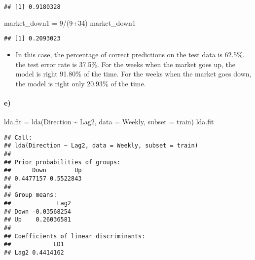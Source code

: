 \documentclass[
]{article}
\newenvironment{Shaded}{\begin{snugshade}}{\end{snugshade}}
\newcommand{\AttributeTok}[1]{\textcolor[rgb]{0.77,0.63,0.00}{#1}}
\newcommand{\DecValTok}[1]{\textcolor[rgb]{0.00,0.00,0.81}{#1}}
\newcommand{\FloatTok}[1]{\textcolor[rgb]{0.00,0.00,0.81}{#1}}
\newcommand{\FunctionTok}[1]{\textcolor[rgb]{0.00,0.00,0.00}{#1}}
\newcommand{\NormalTok}[1]{#1}
\newcommand{\OtherTok}[1]{\textcolor[rgb]{0.56,0.35,0.01}{#1}}
\newcommand{\SpecialCharTok}[1]{\textcolor[rgb]{0.00,0.00,0.00}{#1}}
\providecommand{\tightlist}{%
  \setlength{\itemsep}{0pt}\setlength{\parskip}{0pt}}
\begin{document}
\begin{verbatim}
## [1] 0.9180328
\end{verbatim}

\begin{Shaded}
\begin{Highlighting}[]
\NormalTok{market\_down1 }\OtherTok{=} \DecValTok{9}\SpecialCharTok{/}\NormalTok{(}\DecValTok{9}\SpecialCharTok{+}\DecValTok{34}\NormalTok{)}
\NormalTok{market\_down1}
\end{Highlighting}
\end{Shaded}

\begin{verbatim}
## [1] 0.2093023
\end{verbatim}

\begin{itemize}
\tightlist
\item
  In this case, the percentage of correct predictions on the test data
  is 62.5\%. the test error rate is 37.5\%. For the weeks when the
  market goes up, the model is right 91.80\% of the time. For the weeks
  when the market goes down, the model is right only 20.93\% of the
  time.
\end{itemize}

\hypertarget{e}{%
\paragraph{e)}\label{e}}

\begin{Shaded}
\begin{Highlighting}[]
\NormalTok{lda.fit }\OtherTok{=} \FunctionTok{lda}\NormalTok{(Direction }\SpecialCharTok{\textasciitilde{}}\NormalTok{ Lag2, }\AttributeTok{data =}\NormalTok{ Weekly, }\AttributeTok{subset =}\NormalTok{ train)}
\NormalTok{lda.fit}
\end{Highlighting}
\end{Shaded}

\begin{verbatim}
## Call:
## lda(Direction ~ Lag2, data = Weekly, subset = train)
## 
## Prior probabilities of groups:
##      Down        Up 
## 0.4477157 0.5522843 
## 
## Group means:
##             Lag2
## Down -0.03568254
## Up    0.26036581
## 
## Coefficients of linear discriminants:
##            LD1
## Lag2 0.4414162
\end{verbatim}

\begin{Shaded}
\end{Shaded}
\end{document}

